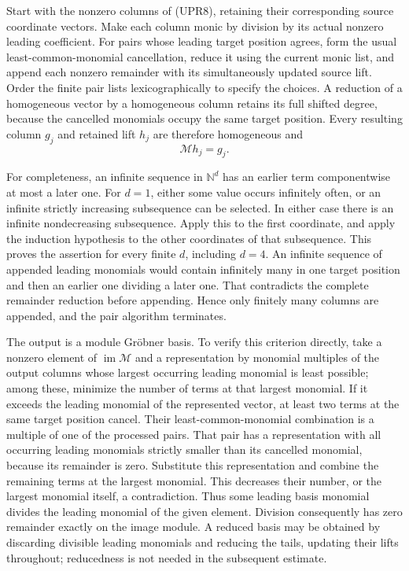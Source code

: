 \documentclass[11pt,a4paper]{article}
\begin{document}
Start with the nonzero columns of (UPR8), retaining their corresponding
source coordinate vectors.  Make each column monic by division by
its actual nonzero leading coefficient.  For pairs whose leading
target position agrees, form the usual least-common-monomial
cancellation, reduce it using the current monic list, and append
each nonzero remainder with its simultaneously updated source
lift.  Order the finite pair lists lexicographically to specify
the choices.  A reduction of a homogeneous vector by a homogeneous
column retains its full shifted degree, because the cancelled
monomials occupy the same target position.  Every resulting column
\(g_j\) and retained lift \(h_j\) are therefore homogeneous and
\[
\mathcal M h_j=g_j.
\tag{UPR10}
\]

For completeness, an infinite sequence in \(\mathbb N^d\) has an
earlier term componentwise at most a later one.  For \(d=1\), either
some value occurs infinitely often, or an infinite strictly
increasing subsequence can be selected.  In either case there is
an infinite nondecreasing subsequence.  Apply this to the first
coordinate, and apply the induction hypothesis to the other
coordinates of that subsequence.  This proves the assertion for
every finite \(d\), including \(d=4\).
An infinite sequence of appended leading monomials would contain
infinitely many in one target position and then an earlier one
dividing a later one.  That contradicts the complete remainder
reduction before appending.  Hence only finitely many columns are
appended, and the pair algorithm terminates.

The output is a module Gr\"obner basis.  To verify this criterion
directly, take a nonzero element of \(\operatorname{im}\mathcal M\)
and a representation by monomial multiples of the output columns
whose largest occurring leading monomial is least possible; among
these, minimize the number of terms at that largest monomial.
If it exceeds the leading monomial of the represented vector,
at least two terms at the same target position cancel.
Their least-common-monomial combination is a multiple of one of
the processed pairs.  That pair has a representation with all
occurring leading monomials strictly smaller than its cancelled
monomial, because its remainder is zero.  Substitute this
representation and combine the remaining terms at the largest
monomial.  This decreases their number, or the largest monomial
itself, a contradiction.  Thus some leading basis monomial divides
the leading monomial of the given element.  Division consequently
has zero remainder exactly on the image module.
A reduced basis may be obtained by discarding divisible leading
monomials and reducing the tails, updating their lifts throughout;
reducedness is not needed in the subsequent estimate.
\end{document}
